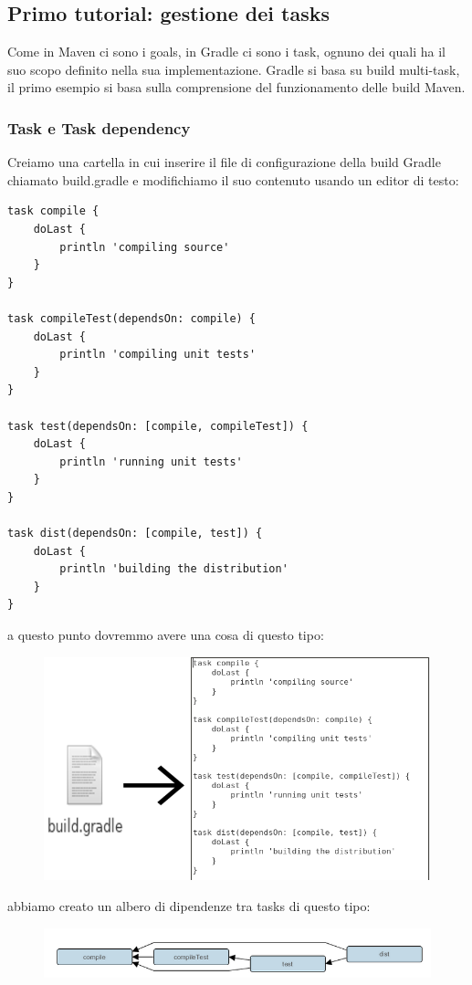 \subsection{Primo tutorial: gestione dei tasks}
Come in Maven ci sono i goals, in Gradle ci sono i task, ognuno dei quali ha il suo scopo definito nella sua implementazione. Gradle si basa su build multi-task, il primo esempio si basa sulla comprensione del funzionamento delle build Maven.

\subsubsection{Task e Task dependency}
Creiamo una cartella in cui inserire il file di configurazione della build Gradle chiamato build.gradle e modifichiamo il suo contenuto usando un editor di testo:
\begin{verbatim}
task compile {
    doLast {
        println 'compiling source'
    }
}

task compileTest(dependsOn: compile) {
    doLast {
        println 'compiling unit tests'
    }
}

task test(dependsOn: [compile, compileTest]) {
    doLast {
        println 'running unit tests'
    }
}

task dist(dependsOn: [compile, test]) {
    doLast {
        println 'building the distribution'
    }
} \end{verbatim}
a questo punto dovremmo avere una cosa di questo tipo:
\begin{figure}[H]
\includegraphics[scale=0.40]{Tutorial/first/gradleexamplefirst.png}
\end{figure} 
abbiamo creato un albero di dipendenze tra tasks di questo tipo:
\label{taskdip}
\begin{figure}[H]
\includegraphics[scale=0.70]{Tutorial/first/taskdipendence.png}
\end{figure}
